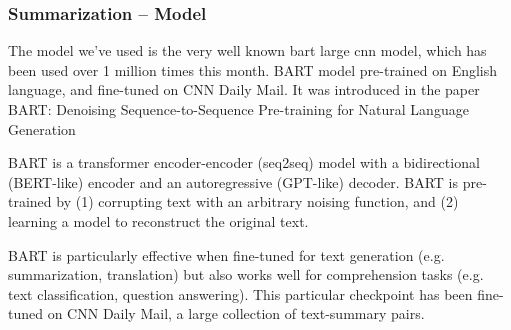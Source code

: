 \subsubsection{Summarization -- Model} %
The model we've used is the very well known bart large cnn model, which has been used over 1 million times this month. BART model pre-trained on English language, and fine-tuned on CNN Daily Mail. It was introduced in the paper BART: Denoising Sequence-to-Sequence Pre-training for Natural Language Generation

BART is a transformer encoder-encoder (seq2seq) model with a bidirectional (BERT-like) encoder and an autoregressive (GPT-like) decoder. BART is pre-trained by (1) corrupting text with an arbitrary noising function, and (2) learning a model to reconstruct the original text.

BART is particularly effective when fine-tuned for text generation (e.g. summarization, translation) but also works well for comprehension tasks (e.g. text classification, question answering). This particular checkpoint has been fine-tuned on CNN Daily Mail, a large collection of text-summary pairs.

